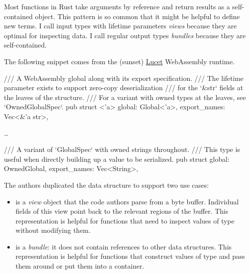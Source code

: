 \documentclass{article}
\begin{document}
Most functions in Rust take arguments by reference and return results as a self-contained object.
This pattern is so common that it might be helpful to define new terms.
I call input types with lifetime parameters \emph{views} because they are optimal for inspecting data.
I call regular output types \emph{bundles} because they are self-contained.

The following snippet comes from the (sunset) \href{https://github.com/bytecodealliance/lucet}{Lucet} WebAssembly runtime.
\begin{code}[rust]
/// A WebAssembly global along with its export specification.
/// The lifetime parameter exists to support zero-copy deserialization
/// for the `\&str` fields at the leaves of the structure.
/// For a variant with owned types at the leaves, see `OwnedGlobalSpec`.
pub struct \href{https://github.com/bytecodealliance/lucet/blob/51fb1ed414fe44f842db437d94abb6eb439d7c92/lucet-module/src/globals.rs#L8}{}<'a> {
    global: Global<'a>,
    export_names: Vec<&'a str>,
}

\ldots

/// A variant of `GlobalSpec` with owned strings throughout.
/// This type is useful when directly building up a value to be serialized.
pub struct \href{https://github.com/bytecodealliance/lucet/blob/51fb1ed414fe44f842db437d94abb6eb439d7c92/lucet-module/src/globals.rs#L112}{} {
    global: OwnedGlobal,
    export_names: Vec<String>,
}
\end{code}

The authors duplicated the  data structure to support two use cases:
\begin{itemize}
  \item
     is a \emph{view} object that the code authors parse from a byte buffer.
    Individual fields of this view point back to the relevant regions of the buffer.
    This representation is helpful for functions that need to inspect values of type  without modifying them.
  \item
     is a \emph{bundle}: it does not contain references to other data structures.
    This representation is helpful for functions that construct values of type  and pass them around or put them into a container.
\end{itemize}
\end{document}
